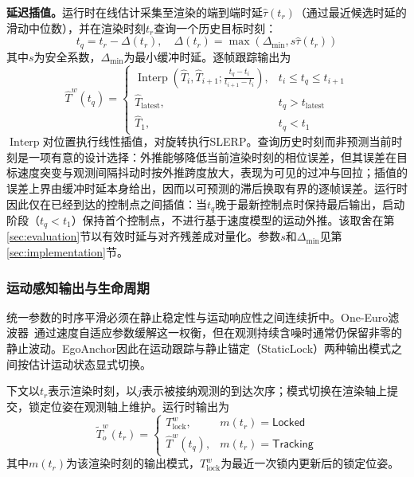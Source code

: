 \documentclass[review]{vgtc}
\begin{document}
\textbf{延迟插值。}运行时在线估计采集至渲染的端到端时延$\widehat{\tau}(t_r)$（通过最近候选时延的滑动中位数），并在渲染时刻$t_r$查询一个历史目标时刻：
\begin{equation}
t_q = t_r - \Delta(t_r), \quad \Delta(t_r) = \max\!\left(\Delta_{\min}, s\widehat{\tau}(t_r)\right)
\label{eq:target-time}
\end{equation}
其中$s$为安全系数，$\Delta_{\min}$为最小缓冲时延。逐帧跟踪输出为
\begin{equation}
\widehat{T}^w(t_q) = \begin{cases}
\operatorname{Interp}\!\left(\widehat{T}_i, \widehat{T}_{i+1}; \frac{t_q - t_i}{t_{i+1} - t_i}\right), & t_i \leq t_q \leq t_{i+1} \\
\widehat{T}_{\mathrm{latest}}, & t_q > t_{\mathrm{latest}} \\
\widehat{T}_1, & t_q < t_1
\end{cases}
\label{eq:delayed-interp}
\end{equation}
$\operatorname{Interp}$对位置执行线性插值，对旋转执行SLERP。查询历史时刻而非预测当前时刻是一项有意的设计选择：外推能够降低当前渲染时刻的相位误差，但其误差在目标速度突变与观测间隔抖动时按外推跨度放大，表现为可见的过冲与回拉；插值的误差上界由缓冲时延本身给出，因而以可预测的滞后换取有界的逐帧误差。运行时因此仅在已经到达的控制点之间插值：当$t_q$晚于最新控制点时保持最后输出，启动阶段（$t_q < t_1$）保持首个控制点，不进行基于速度模型的运动外推。该取舍在第\ref{sec:evaluation}节以有效时延与对齐残差成对量化。参数$s$和$\Delta_{\min}$见第\ref{sec:implementation}节。

\subsubsection{运动感知输出与生命周期}\label{sec:staticlock}

统一参数的时序平滑必须在静止稳定性与运动响应性之间连续折中。One-Euro滤波器~\cite{casiez2012oneeuro}通过速度自适应参数缓解这一权衡，但在观测持续含噪时通常仍保留非零的静止波动。EgoAnchor因此在运动跟踪与静止锚定（StaticLock）两种输出模式之间按估计运动状态显式切换。

下文以$t_r$表示渲染时刻，以$j$表示被接纳观测的到达次序；模式切换在渲染轴上提交，锁定位姿在观测轴上维护。运行时输出为
\begin{equation}
\widetilde{T}_o^w(t_r) = \begin{cases}
T_{\mathrm{lock}}^w, & m(t_r) = \mathsf{Locked} \\
\widehat{T}^w(t_q), & m(t_r) = \mathsf{Tracking}
\end{cases}
\label{eq:staticlock}
\end{equation}
其中$m(t_r)$为该渲染时刻的输出模式，$T_{\mathrm{lock}}^w$为最近一次锁内更新后的锁定位姿。
\end{document}
